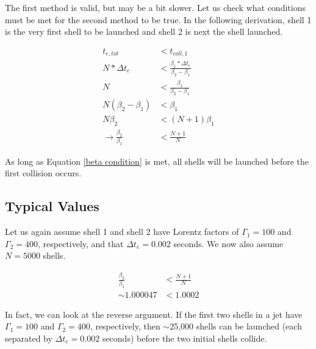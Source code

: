 \documentclass[10pt]{article}
\begin{document}
The first method is valid, but may be a bit slower. Let us check what conditions must be met for the second method to be true. In the following derivation, shell 1 is the very first shell to be launched and shell 2 is next the shell launched.

\begin{align}
	t_{e,tot} &< t_{coll,1} \\
	N*\Delta t_e &< \frac{\beta_1 * \Delta t_e}{\beta_2 - \beta_1}\\
	N &< \frac{\beta_1}{\beta_2 - \beta_1} \\ 
	N(\beta_2 - \beta_1) &< \beta_1 \\
	N\beta_2 &< (N+1)\beta_1 \\
	\rightarrow \frac{\beta_2}{\beta_1} &< \frac{N+1}{N} \label{beta condition}
\end{align}

As long as Equation \ref{beta condition} is met, all shells will be launched before the first collision occurs. 

\subsection*{Typical Values}

Let us again assume shell 1 and shell 2 have Lorentz factors of $\Gamma_1=100$ and $\Gamma_2=400$, respectively, and that $\Delta t_e = 0.002$ seconds. We now also assume $N=5000$ shells.

\begin{align}
	\frac{\beta_2}{\beta_1} &< \frac{N+1}{N} \\
	\sim1.000047 &< 1.0002
\end{align}

In fact, we can look at the reverse argument. If the first two shells in a jet have $\Gamma_1=100$ and $\Gamma_2=400$, respectively, then $\sim$25,000 shells can be launched (each separated by $\Delta t_e = 0.002$ seconds) before the two initial shells collide.
\end{document}
